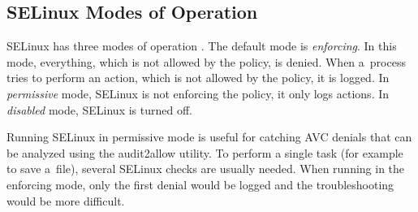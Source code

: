 \subsection{SELinux Modes of Operation}

SELinux has three modes of operation \cite{selinuxguide}. The default mode is
\emph{enforcing}. In this mode, everything, which is not allowed by the policy,
is denied. When a~process tries to perform an action, which is not allowed by
the policy, it is logged. In \emph{permissive} mode, SELinux is not enforcing
the policy, it only logs actions. In \emph{disabled} mode, SELinux is turned
off.

Running SELinux in permissive mode is useful for catching AVC denials that can
be analyzed using the audit2allow utility. To perform a single task (for example
to save a~file), several SELinux checks are usually needed. When running in the
enforcing mode, only the first denial would be logged and the troubleshooting
would be more difficult.

